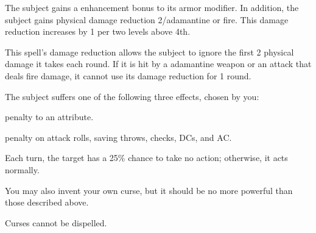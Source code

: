 \spelldur{\durshort}
\begin{spelleffect}
  The subject gains a  enhancement bonus to its armor modifier. \bonusscalingdescription In addition, the subject gains physical damage reduction 2/adamantine or fire. This damage reduction increases by 1 per two levels above 4th.
\end{spelleffect}
\begin{spellnotes}
  This spell's damage reduction allows the subject to ignore the first 2 physical damage it takes each round. If it is hit by a adamantine weapon or an attack that deals fire damage, it cannot use its damage reduction for 1 round.
\end{spellnotes}

\spellrng{\rngclose}
\begin{spelleffect}
  The subject suffers one of the following three effects, chosen by you:
  \begin{itemize*}
    \item {} penalty to an attribute.
    \item {} penalty on attack rolls, saving throws, checks, DCs, and AC.
    \item Each turn, the target has a 25\% chance to take no action; otherwise, it acts normally.
  \end{itemize*}
  \par You may also invent your own curse, but it should be no more powerful than those described above.
\end{spelleffect}
\begin{spellnotes}
  Curses cannot be dispelled.
\end{spellnotes}

